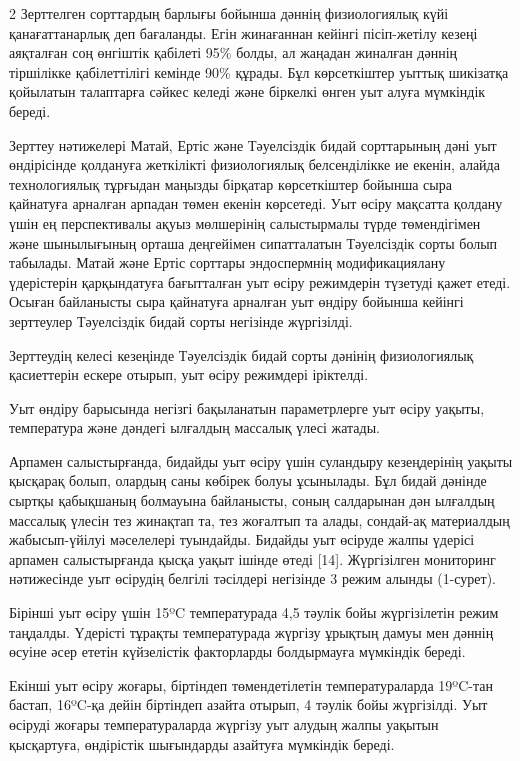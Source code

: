 \begin{multicols}{2}
Зерттелген сорттардың барлығы бойынша дәннің физиологиялық күйі
қанағаттанарлық деп бағаланды. Егін жинағаннан кейінгі пісіп-жетілу
кезеңі аяқталған соң өнгіштік қабілеті 95\% болды, ал жаңадан жиналған
дәннің тіршілікке қабілеттілігі кемінде 90\% құрады. Бұл көрсеткіштер
уыттық шикізатқа қойылатын талаптарға сәйкес келеді және біркелкі өнген
уыт алуға мүмкіндік береді.

Зерттеу нәтижелері Матай, Ертіс және Тәуелсіздік бидай сорттарының дәні
уыт өндірісінде қолдануға жеткілікті физиологиялық белсенділікке ие
екенін, алайда технологиялық тұрғыдан маңызды бірқатар көрсеткіштер
бойынша сыра қайнатуға арналған арпадан төмен екенін көрсетеді. Уыт
өсіру мақсатта қолдану үшін ең перспективалы ақуыз мөлшерінің
салыстырмалы түрде төмендігімен және шынылығының орташа деңгейімен
сипатталатын Тәуелсіздік сорты болып табылады. Матай және Ертіс сорттары
эндоспермнің модификациялану үдерістерін қарқындатуға бағытталған уыт
өсіру режимдерін түзетуді қажет етеді. Осыған байланысты сыра қайнатуға
арналған уыт өндіру бойынша кейінгі зерттеулер Тәуелсіздік бидай сорты
негізінде жүргізілді.

Зерттеудің келесі кезеңінде Тәуелсіздік бидай сорты дәнінің
физиологиялық қасиеттерін ескере отырып, уыт өсіру режимдері іріктелді.

Уыт өндіру барысында негізгі бақыланатын параметрлерге уыт өсіру уақыты,
температура және дәндегі ылғалдың массалық үлесі жатады.

Арпамен салыстырғанда, бидайды уыт өсіру үшін суландыру кезеңдерінің
уақыты қысқарақ болып, олардың саны көбірек болуы ұсынылады. Бұл бидай
дәнінде сыртқы қабықшаның болмауына байланысты, соның салдарынан дән
ылғалдың массалық үлесін тез жинақтап та, тез жоғалтып та алады,
сондай-ақ материалдың жабысып-үйілуі мәселелері туындайды. Бидайды уыт
өсіруде жалпы үдерісі арпамен салыстырғанда қысқа уақыт ішінде өтеді
{[}14{]}. Жүргізілген мониторинг нәтижесінде уыт өсірудің белгілі
тәсілдері негізінде 3 режим алынды (1-сурет).

Бірінші уыт өсіру үшін 15ºC температурада 4,5 тәулік бойы жүргізілетін
режим таңдалды. Үдерісті тұрақты температурада жүргізу ұрықтың дамуы мен
дәннің өсуіне әсер ететін күйзелістік факторларды болдырмауға мүмкіндік
береді.

Екінші уыт өсіру жоғары, біртіндеп төмендетілетін температураларда
19ºC-тан бастап, 16ºC-қа дейін біртіндеп азайта отырып, 4 тәулік бойы
жүргізілді. Уыт өсіруді жоғары температураларда жүргізу уыт алудың жалпы
уақытын қысқартуға, өндірістік шығындарды азайтуға мүмкіндік береді.


\end{multicols}
